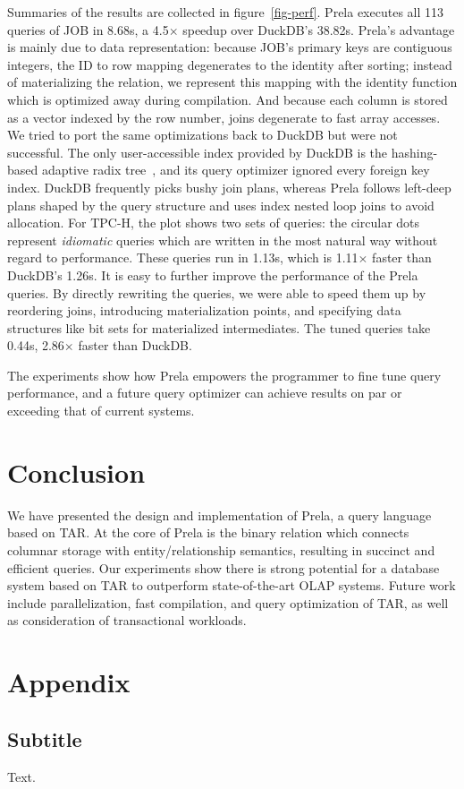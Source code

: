 \documentclass[sigconf,screen,pbalance]{cidr-2027}
\newcommand{\noun}[1]{\textsf{#1}}
\begin{document}
Summaries of the results are collected in figure~\ref{fig-perf}.
Prela executes all 113 queries of JOB in 8.68s, a 4.5$\times$ speedup over DuckDB's 38.82s.
Prela's advantage is mainly due to data representation: because JOB's primary keys are contiguous integers, the ID to row mapping degenerates to the identity after sorting; instead of materializing the relation, we represent this mapping with the identity function which is optimized away during compilation.
And because each column is stored as a vector indexed by the row number, joins degenerate to fast array accesses.
We tried to port the same optimizations back to DuckDB but were not successful.
The only user-accessible index provided by DuckDB is the hashing-based adaptive radix tree~\cite{DBLP:conf/icde/LeisK013}, and its query optimizer ignored every foreign key index.
DuckDB frequently picks bushy join plans, whereas Prela follows left-deep plans shaped by the query structure and uses index nested loop joins to avoid allocation.
For TPC-H, the plot shows two sets of queries: the circular dots represent \emph{idiomatic} queries which are written in the most natural way without regard to performance.
These queries run in 1.13s, which is 1.11$\times$ faster than DuckDB's 1.26s.
It is easy to further improve the performance of the Prela queries.
By directly rewriting the queries, we were able to speed them up by reordering joins, introducing materialization points, and specifying data structures like bit sets for materialized intermediates.
The tuned queries take 0.44s, 2.86$\times$ faster than DuckDB.

The experiments show how Prela empowers the programmer to fine tune query performance, and a future query optimizer can achieve results on par or exceeding that of current systems.

\section{Conclusion}

We have presented the design and implementation of Prela, a query language based on \noun{TAR}.
At the core of Prela is the binary relation which connects columnar storage with entity/relationship semantics, resulting in succinct and efficient queries.
Our experiments show there is strong potential for a database system based on \noun{TAR} to outperform state-of-the-art OLAP systems.
Future work include parallelization, fast compilation, and query optimization of \noun{TAR}, as well as consideration of transactional workloads.




\appendix

\section{Appendix}\label{app-a}

\subsection{Subtitle}

Text.
\end{document}

